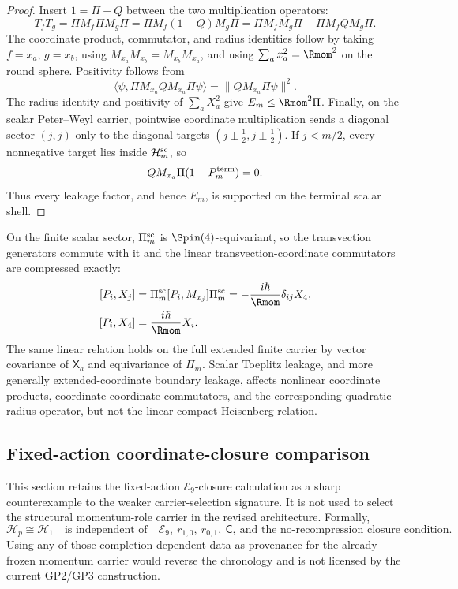 \documentclass[11pt,a4paper]{article}
\begin{document}
\begin{proof}
Insert \(1=\Pi+Q\) between the two multiplication operators:
\[
T_fT_g=\Pi M_f\Pi M_g\Pi
=\Pi M_f(1-Q)M_g\Pi
=\Pi M_fM_g\Pi-\Pi M_fQM_g\Pi.
\]
The coordinate product, commutator, and radius identities follow by taking \(f=x_a\), \(g=x_b\), using \(M_{x_a}M_{x_b}=M_{x_b}M_{x_a}\), and using \(\sum_a x_a^2=\Rmom^2\) on the round sphere.  Positivity follows from
\[
\langle\psi,\Pi M_{x_a}QM_{x_a}\Pi\psi\rangle=\|QM_{x_a}\Pi\psi\|^2.
\]
The radius identity and positivity of
\(\sum_aX_a^2\) give \(E_m\le\Rmom^2\Pi\).  Finally, on the scalar
Peter--Weyl carrier, pointwise coordinate multiplication sends a diagonal
sector \((j,j)\) only to the diagonal targets
\((j\pm\tfrac12,j\pm\tfrac12)\).  If \(j<m/2\), every nonnegative target
lies inside \(\mathcal H_m^{\rm sc}\), so
\[
        QM_{x_a}\Pi(1-P_m^{\rm term})=0.
\]
Thus every leakage factor, and hence \(E_m\), is supported on the terminal
scalar shell.
\end{proof}

\begin{remark}
\leavevmode\par\noindent
On the finite scalar sector, \(\Pi_m^{\rm sc}\) is
\(\Spin(4)\)-equivariant, so the transvection generators commute with it and
the linear transvection-coordinate commutators are compressed exactly:
\begin{equation}
\begin{aligned}
  \relax[P_i,X_j]
  &= \Pi_m^{\rm sc}[P_i,M_{x_j}]\Pi_m^{\rm sc}
   = -\frac{i\hbar}{\Rmom}\delta_{ij}X_4,
  \\
  [P_i,X_4]
  &= \frac{i\hbar}{\Rmom}X_i.
\end{aligned}
\end{equation}
The same linear relation holds on the full extended finite carrier by vector covariance
of \(\mathsf X_a\) and equivariance of \(\Pi_m\).  Scalar Toeplitz leakage,
and more generally extended-coordinate boundary leakage, affects nonlinear
coordinate products, coordinate-coordinate commutators, and the corresponding
quadratic-radius operator, but not the linear compact Heisenberg relation.
\end{remark}




\subsection{Fixed-action coordinate-closure comparison}
\label{p2c:app:e9-diagnostic}
This section retains the fixed-action \(\mathcal E_9\)-closure calculation
as a sharp counterexample to the weaker carrier-selection signature.  It is not used
to select the structural momentum-role carrier in the revised architecture.
Formally,
\[
 \boxed{
 \mathcal H_p\cong\mathcal H_1
 \quad\text{is independent of}\quad
 \mathcal E_9,\ r_{1,0},\ r_{0,1},\ \mathsf C,
 \ \text{and the no-recompression closure condition}.}
\]
Using any of those completion-dependent data as provenance for the already
frozen momentum carrier would reverse the chronology and is not licensed by
the current GP2/GP3 construction.
\end{document}
